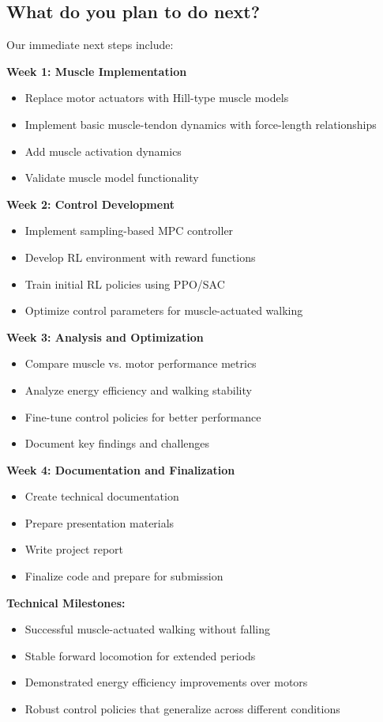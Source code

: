 \documentclass{article}
\begin{document}
\subsection{What do you plan to do next?}

Our immediate next steps include:

\textbf{Week 1: Muscle Implementation}
\begin{itemize}
    \item Replace motor actuators with Hill-type muscle models
    \item Implement basic muscle-tendon dynamics with force-length relationships
    \item Add muscle activation dynamics
    \item Validate muscle model functionality
\end{itemize}

\textbf{Week 2: Control Development}
\begin{itemize}
    \item Implement sampling-based MPC controller
    \item Develop RL environment with reward functions
    \item Train initial RL policies using PPO/SAC
    \item Optimize control parameters for muscle-actuated walking
\end{itemize}

\textbf{Week 3: Analysis and Optimization}
\begin{itemize}
    \item Compare muscle vs. motor performance metrics
    \item Analyze energy efficiency and walking stability
    \item Fine-tune control policies for better performance
    \item Document key findings and challenges
\end{itemize}

\textbf{Week 4: Documentation and Finalization}
\begin{itemize}
    \item Create technical documentation
    \item Prepare presentation materials
    \item Write project report
    \item Finalize code and prepare for submission
\end{itemize}

\textbf{Technical Milestones:}
\begin{itemize}
    \item Successful muscle-actuated walking without falling
    \item Stable forward locomotion for extended periods
    \item Demonstrated energy efficiency improvements over motors
    \item Robust control policies that generalize across different conditions
\end{itemize}
\end{document}
